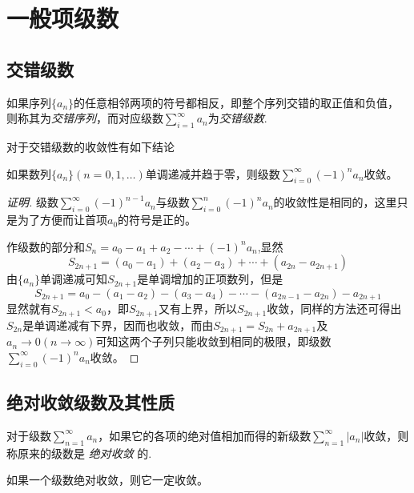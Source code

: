 
\section{一般项级数}
\label{sec:signed-series}

\subsection{交错级数}
\label{sec:alternating-sign-series}

\begin{definition}
  如果序列$\{a_n\}$的任意相邻两项的符号都相反，即整个序列交错的取正值和负值，则称其为\emph{交错序列}，而对应级数$\sum_{i=1}^{\infty}a_n$为\emph{交错级数}.
\end{definition}

对于交错级数的收敛性有如下结论

\begin{theorem}
  如果数列$\{a_n\}(n=0,1,\ldots)$单调递减并趋于零，则级数$\sum_{i=0}^{\infty}(-1)^{n}a_n$收敛。
\end{theorem}

\begin{proof}[证明]
级数$\sum_{i=0}^{\infty}(-1)^{n-1}a_n$与级数$\sum_{i=0}^n(-1)^na_n$的收敛性是相同的，这里只是为了方便而让首项$a_0$的符号是正的。  

作级数的部分和$S_n=a_0-a_1+a_2-\cdots+(-1)^na_n$,显然
\[ S_{2n+1}=(a_0-a_1)+(a_2-a_3)+\cdots+(a_{2n}-a_{2n+1}) \]
由$\{a_n\}$单调递减可知$S_{2n+1}$是单调增加的正项数列，但是
\[ S_{2n+1}=a_0-(a_1-a_2)-(a_3-a_4)-\cdots-(a_{2n-1}-a_{2n})-a_{2n+1} \]
显然就有$S_{2n+1}<a_0$，即$S_{2n+1}$又有上界，所以$S_{2n+1}$收敛，同样的方法还可得出$S_{2n}$是单调递减有下界，因而也收敛，而由$S_{2n+1}=S_{2n}+a_{2n+1}$及$a_n \to 0(n \to \infty)$可知这两个子列只能收敛到相同的极限，即级数$\sum_{i=0}^{\infty}(-1)^na_n$收敛。
\end{proof}

\subsection{绝对收敛级数及其性质}
\label{sec:abs-converage-series-and-its-properties}

\begin{definition}
  对于级数$\sum_{n=1}^{\infty}a_n$，如果它的各项的绝对值相加而得的新级数$\sum_{n=1}^{\infty}|a_n|$收敛，则称原来的级数是 \emph{绝对收敛} 的.
\end{definition}

\begin{theorem}
  如果一个级数绝对收敛，则它一定收敛。
\end{theorem}

